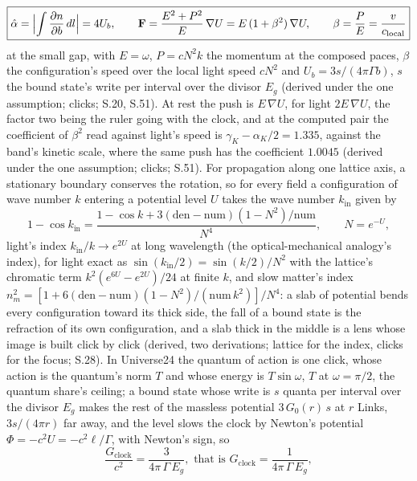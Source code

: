 \documentclass[pdflatex,sn-mathphys-num]{sn-jnl}
\newcommand{\num}{\mathrm{num}}
\newcommand{\den}{\mathrm{den}}
\theoremstyle{thmstyleone}
\theoremstyle{thmstyletwo}
\begin{document}
\begin{equation}\label{eq:push}
\boxed{\hat\alpha = \Bigl|\int \frac{\partial n}{\partial b}\,dl\Bigr| = 4U_b, \qquad \mathbf F = \frac{E^2 + P^2}{E}\,\nabla U = E\,(1 + \beta^2)\,\nabla U, \qquad \beta = \frac{P}{E} = \frac{v}{c_{\mathrm{local}}}}
\end{equation}
at the small gap, with $E = \omega$, $P = cN^2 k$ the momentum at the composed paces, $\beta$ the configuration's speed over the local light speed $cN^2$ and $U_b = 3s / (4\pi\Gamma b)$, $s$ the bound state's write per interval over the divisor $E_g$ (derived under the one assumption; clicks; S.20, S.51). At rest the push is $E\,\nabla U$, for light $2E\,\nabla U$, the factor two being the ruler going with the clock, and at the computed pair the coefficient of $\beta^2$ read against light's speed is $\gamma_K - \alpha_K / 2 = 1.335$, against the band's kinetic scale, where the same push has the coefficient $1.0045$ (derived under the one assumption; clicks; S.51). For propagation along one lattice axis, a stationary boundary conserves the rotation, so for every field a configuration of wave number $k$ entering a potential level $U$ takes the wave number $k_{\mathrm{in}}$ given by
\begin{equation}\label{eq:lens}
\boxed{1 - \cos k_{\mathrm{in}} = \frac{1 - \cos k + 3(\den - \num)(1 - N^2) / \num}{N^4}, \qquad N = e^{-U}},
\end{equation}
light's index $k_{\mathrm{in}} / k \to e^{2U}$ at long wavelength (the optical-mechanical analogy's index), for light exact as $\sin(k_{\mathrm{in}} / 2) = \sin(k / 2) / N^2$ with the lattice's chromatic term $k^2 (e^{6U} - e^{2U}) / 24$ at finite $k$, and slow matter's index $n_m^2 = [1 + 6(\den - \num)(1 - N^2) / (\num\,k^2)] / N^4$: a slab of potential bends every configuration toward its thick side, the fall of a bound state is the refraction of its own configuration, and a slab thick in the middle is a lens whose image is built click by click (derived, two derivations; lattice for the index, clicks for the focus; S.28). In Universe24 the quantum of action is one click, whose action is the quantum's norm $T$ and whose energy is $T\sin\omega$, $T$ at $\omega = \pi / 2$, the quantum share's ceiling; a bound state whose write is $s$ quanta per interval over the divisor $E_g$ makes the rest of the massless potential $3\,G_0(r)\,s$ at $r$ Links, $3s / (4\pi r)$ far away, and the level slows the clock by Newton's potential $\Phi = -c^2 U = -c^2\ell / \Gamma$, with Newton's sign, so
\begin{equation}\label{eq:G}
\boxed{\frac{G_{\mathrm{clock}}}{c^2} = \frac{3}{4\pi\,\Gamma\,E_g}, \text{ that is } G_{\mathrm{clock}} = \frac{1}{4\pi\,\Gamma\,E_g}},
\end{equation}
\end{document}
